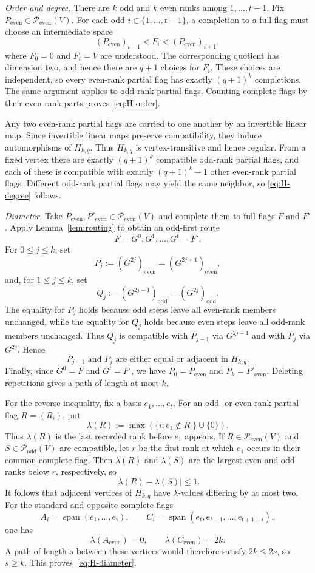 \documentclass[11pt]{article}
\makeatletter
\theoremstyle{plain}
\theoremstyle{definition}
\renewenvironment{proof}[1][\proofname]
{\par\pushQED{\qed}
	\normalfont\topsep6\p@\@plus6\p@\relax\trivlist
	\item[\hskip\labelsep\bfseries#1\@addpunct{.}]
	\ignorespaces}
{\popQED\endtrivlist\@endpefalse}
\makeatother
\begin{document}
\begin{proof}
\smallskip
\noindent\emph{Order and degree.}
There are $k$ odd and $k$ even ranks among $1,\ldots,t-1$.  Fix
$P_{\mathrm{even}}\in\mathcal P_{\mathrm{even}}(V)$.  For each odd
$i\in\{1,\ldots,t-1\}$, a completion to a full flag must choose an
intermediate space
$$(P_{\mathrm{even}})_{i-1}<F_i<(P_{\mathrm{even}})_{i+1},$$
where $F_0=0$ and $F_t=V$ are understood.  The corresponding quotient has dimension two, and hence there are $q+1$ choices for $F_i$.  These choices are independent, so every even-rank partial flag has exactly $(q+1)^k$ completions.  The same argument applies to odd-rank partial flags.  Counting complete flags by their even-rank parts proves~\eqref{eq:H-order}.

Any two even-rank partial flags are carried to one another by an invertible linear map.  Since invertible linear maps preserve compatibility, they induce automorphisms of $H_{k,q}$.  Thus $H_{k,q}$ is vertex-transitive and hence regular.  From a fixed vertex there are exactly $(q+1)^k$ compatible odd-rank partial flags, and each of these is compatible with exactly $(q+1)^k-1$ other even-rank partial flags.  Different odd-rank partial flags may yield the same neighbor, so \eqref{eq:H-degree} follows.

\smallskip
\noindent\emph{Diameter.}
Take $P_{\mathrm{even}},P'_{\mathrm{even}}
\in\mathcal P_{\mathrm{even}}(V)$ and complete them to full flags $F$ and $F'$.  Apply Lemma~\ref{lem:routing} to obtain an odd-first route
$$F=G^0,G^1,\ldots,G^t=F'.$$
For $0\le j\le k$, set
$$P_j:=(G^{2j})_{\mathrm{even}}
      =(G^{2j+1})_{\mathrm{even}},$$
and, for $1\le j\le k$, set
$$Q_j:=(G^{2j-1})_{\mathrm{odd}}
      =(G^{2j})_{\mathrm{odd}}.$$
The equality for $P_j$ holds because odd steps leave all even-rank
members unchanged, while the equality for $Q_j$ holds because even
steps leave all odd-rank members unchanged. Thus $Q_j$ is compatible
with $P_{j-1}$ via $G^{2j-1}$ and with $P_j$ via $G^{2j}$. Hence
$$  P_{j-1} \text{ and } P_j \text{ are either equal or adjacent in } H_{k,q}.$$
Finally, since $G^0=F$ and $G^t=F'$, we have
$P_0=P_{\mathrm{even}}$ and $P_k=P'_{\mathrm{even}}$.
Deleting repetitions gives a path of length at most $k$.

For the reverse inequality, fix a basis $e_1,\ldots,e_t$.  For an odd- or even-rank partial flag $R=(R_i)$, put
$$\lambda(R):=\max\left(\{i:e_1\notin R_i\}\cup\{0\}\right).$$
Thus $\lambda(R)$ is the last recorded rank before $e_1$ appears.  If
$R\in\mathcal P_{\mathrm{even}}(V)$ and $S\in\mathcal P_{\mathrm{odd}}(V)$ are compatible, let $r$ be the first rank at which $e_1$ occurs in their common complete flag.  Then $\lambda(R)$ and $\lambda(S)$ are the largest even and odd ranks below $r$, respectively, so
$$|\lambda(R)-\lambda(S)|\le1.$$
It follows that adjacent vertices of $H_{k,q}$ have $\lambda$-values
differing by at most two.  For the standard and opposite complete flags
$$A_i=\operatorname{span}(e_1,\ldots,e_i),
  \qquad
  C_i=\operatorname{span}(e_t,e_{t-1},\ldots,e_{t+1-i}),$$
one has
$$\lambda(A_{\mathrm{even}})=0,
  \qquad
  \lambda(C_{\mathrm{even}})=2k.$$
A path of length $s$ between these vertices would therefore satisfy $2k\le2s$, so $s\ge k$.  This proves~\eqref{eq:H-diameter}.


\end{proof}
\end{document}
